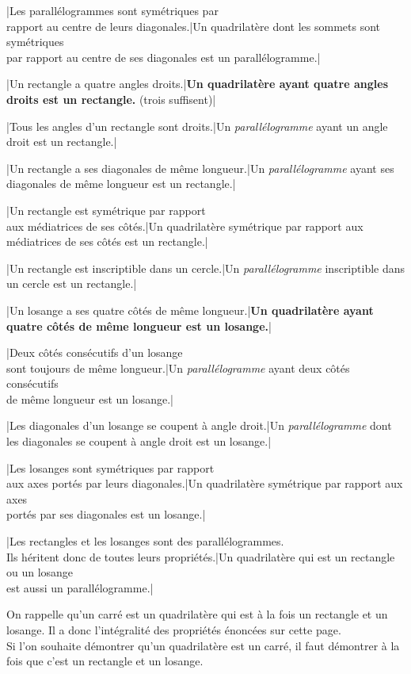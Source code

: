 \documentclass[a4paper, landscape, 10pt]{article}
\begin{document}
|Les parallélogrammes sont symétriques par\\ rapport au centre de leurs diagonales.|Un quadrilatère dont les sommets sont symétriques\\ par rapport au centre de ses diagonales est un parallélogramme.|

|Un rectangle a quatre angles droits.|{\bf Un quadrilatère ayant quatre angles droits est un rectangle.} (trois suffisent)|

|Tous les angles d'un rectangle sont droits.|Un {\it parallélogramme} ayant un angle droit est un rectangle.|

|Un rectangle a ses diagonales de même longueur.|Un {\it parallélogramme} ayant ses diagonales de même longueur est un rectangle.|

|Un rectangle est symétrique par rapport\\ aux médiatrices de ses côtés.|Un quadrilatère symétrique par rapport aux\\ médiatrices de ses côtés est un rectangle.|

|Un rectangle est inscriptible dans un cercle.|Un {\it parallélogramme} inscriptible dans un cercle est un rectangle.|

|Un losange a ses quatre côtés de même longueur.|{\bf Un quadrilatère ayant quatre côtés de même longueur est un losange.}|

|Deux côtés consécutifs d'un losange\\ sont toujours de même longueur.|Un {\it parallélogramme} ayant deux côtés consécutifs\\ de même longueur est un losange.|

|Les diagonales d'un losange se coupent à angle droit.|Un {\it parallélogramme} dont les diagonales se coupent à angle droit est un losange.|

|Les losanges sont symétriques par rapport\\ aux axes portés par leurs diagonales.|Un quadrilatère symétrique par rapport aux axes\\ portés par ses diagonales est un losange.|

|Les rectangles et les losanges sont des parallélogrammes.\\Ils héritent donc de toutes leurs propriétés.|Un quadrilatère qui est un rectangle ou un losange\\ est aussi un parallélogramme.|

\vfill

On rappelle qu'un carré est un quadrilatère qui est à la fois un rectangle et un losange. Il a donc l'intégralité des propriétés énoncées sur cette page.\\
Si l'on souhaite démontrer qu'un quadrilatère est un carré, il faut démontrer à la fois que c'est un rectangle et un losange.
\end{document}
